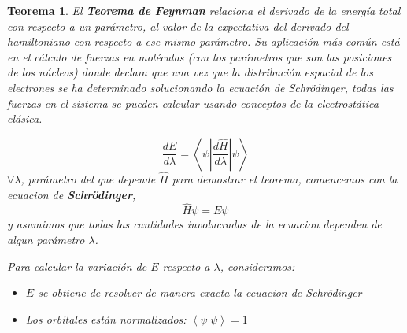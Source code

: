 \documentclass[a4paper]{IEEEtran} %
\newtheorem{teor}{Teorema}[section] %
\begin{document}
\begin{teor}
\rm %
\label{ejemplo_de_teorema_ejemplo_o_experimento_ecuaciones}
El \textbf{Teorema de Feynman} relaciona el derivado de la energía total con respecto a un parámetro, al valor de la expectativa del derivado del hamiltoniano con respecto a ese mismo parámetro. Su aplicación más común está en el cálculo de fuerzas en moléculas (con los parámetros que son las posiciones de los núcleos) donde declara que una vez que la distribución espacial de los electrones se ha determinado solucionando la ecuación de Schrödinger, todas las fuerzas en el sistema se pueden calcular usando conceptos de la electrostática clásica.

\begin{equation}
\frac{dE}{d \lambda} = \left\langle \psi \left| \frac{d \widehat{H}}{d \lambda} \right| \psi \right\rangle 
\end{equation}
$\forall \lambda$, parámetro del que depende $\widehat{H}$ 
para demostrar el teorema, comencemos con la ecuacion de \textbf{Schrödinger}, 
\begin{equation*}
\widehat{H} \psi = E \psi
\end{equation*}
y asumimos que todas las cantidades involucradas de la ecuacion dependen de algun parámetro $\lambda$.

Para calcular la variación de $E$ respecto a $\lambda$, consideramos: 

\begin{itemize}
\item $E$ se obtiene de resolver de manera exacta la ecuacion de Schrödinger
\item Los orbitales están normalizados: $\left\langle \psi | \psi \right\rangle= 1$
\end{itemize}


\end{teor}
\end{document}
